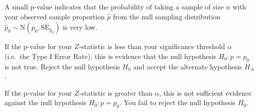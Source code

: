 \documentclass[
  letterpaper,
  DIV=11,
  numbers=noendperiod]{scrartcl}
\begin{document}
A small p-value indicates that the probability of taking a sample of
size \(n\) with your observed sample proportion \(\hat{p}\) from the
null sampling distribution
\(\hat{p}_0 \sim \text{N}\left(p_0, \text{SE}_{\hat{p}_0}\right)\) is
very low.

If the p-value for your \(Z\)-statistic is less than your significance
threshold \(\alpha\) (i.e.~the Type I Error Rate), this is evidence that
the null hypothesis \(H_0 \colon p=p_0\) is not true. Reject the null
hypothesis \(H_0\) and accept the alternate hypothesis \(H_A\).

If the p-value for your \(Z\)-statistic is greater than \(\alpha\), this
is not sufficient evidence against the null hypothesis
\(H_0 \colon p=p_0\). You fail to reject the null hypothesis \(H_0\).
\end{document}
